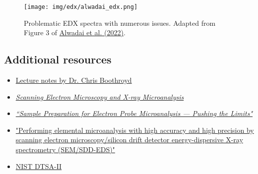 \documentclass[letterpaper, 12pt]{article}
\begin{document}
\begin{figure}[h!tbp]
    \centering
    \texttt{[image: img/edx/alwadai\_edx.png]}
    \caption*{Problematic EDX spectra with numerous issues. Adapted from Figure 3 of \href{https://doi.org/10.1007/s10854-022-08265-y}{Alwadai et al. (2022)}.}
\end{figure}

\subsection*{Additional resources}

\begin{itemize}
    \setlength\itemsep{-0.5em}
    \item \href{https://fy.chalmers.se/~f10mh/Halvarsson/EM_intro_course_files/EDX%20intro.pdf}{Lecture notes by Dr. Chris Boothroyd}
    \item \href{https://doi.org/10.1007/978-1-4939-6676-9}{\textit{Scanning Electron Microscopy and X-ray Microanalysis}}
    \item  \href{https://doi.org/10.6028/jres.107.051}{\textit{``Sample Preparation for Electron Probe
Microanalysis — Pushing the Limits"}}
    \item \href{https://doi.org/10.1007/s10853-014-8685-2}{"Performing elemental microanalysis with high accuracy and high precision by scanning electron microscopy/silicon drift detector energy-dispersive X-ray spectrometry (SEM/SDD-EDS)"}
    \item \href{https://www.cstl.nist.gov/div837/837.02/epq/dtsa2/index.html}{NIST DTSA-II}
\end{itemize}

\end{document}
